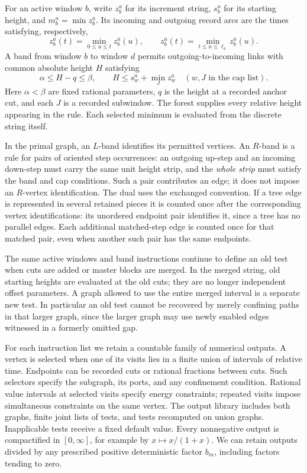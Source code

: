For an active window $b$, write $z^a_b$ for its increment string,
$s^a_b$ for its starting height, and $m^a_b=\min z^a_b$.
Its incoming and outgoing record arcs are the times satisfying,
respectively,
\[
 z^a_b(t)=\min_{0\le u\le t}z^a_b(u),
 \qquad
 z^a_b(t)=\min_{t\le u\le\ell_b}z^a_b(u).
\]
A band from window $b$ to window $d$ permits outgoing-to-incoming
links with common absolute height $H$ satisfying
\begin{equation}\label{inp:bands}
 \alpha\le H-q\le\beta,
 \qquad H\le s^a_w+\min_J z^a_w\quad(w,J\text{ in the cap list}).
\end{equation}
Here $\alpha<\beta$ are fixed rational parameters, $q$ is the height
at a recorded anchor cut, and each $J$ is a recorded subwindow.
The forest supplies every relative height appearing in the rule.
Each selected minimum is evaluated from the discrete string itself.

In the primal graph, an $L$-band identifies its permitted vertices.
An $R$-band is a rule for pairs of oriented step occurrences: an
outgoing up-step and an incoming down-step must carry the same unit
height strip, and the \emph{whole strip} must satisfy the band and cap
conditions.  Such a pair contributes an edge; it does not impose an
$R$-vertex identification.  The dual uses the exchanged convention.
If a tree edge is represented in several retained pieces it is counted
once after the corresponding vertex identifications: its unordered
endpoint pair identifies it, since a tree has no parallel edges.
Each additional matched-step edge is counted once for that matched
pair, even when another such pair has the same endpoints.

The same active windows and band instructions continue to define an
old test when cuts are added or master blocks are merged.  In the
merged string, old starting heights are evaluated at the old cuts;
they are no longer independent offset parameters.  A graph allowed
to use the entire merged interval is a separate new test.  In
particular an old test cannot be recovered by merely confining paths
in that larger graph, since the larger graph may use newly enabled
edges witnessed in a formerly omitted gap.

For each instruction list we retain a countable family of numerical
outputs.  A vertex is selected when one of its visits lies in a finite
union of intervals of relative time.  Endpoints can be recorded cuts
or rational fractions between cuts.  Such selectors specify the
subgraph, its ports, and any confinement condition.  Rational value
intervals at selected visits specify energy constraints; repeated
visits impose simultaneous constraints on the same vertex.  The
output library includes both graphs, finite joint lists of tests,
and tests recomputed on union graphs.  Inapplicable tests receive a
fixed default value.  Every nonnegative output is compactified in
$[0,\infty]$, for example by $x\mapsto x/(1+x)$.
We can retain outputs divided by any prescribed positive deterministic
factor $b_m$, including factors tending to zero.

